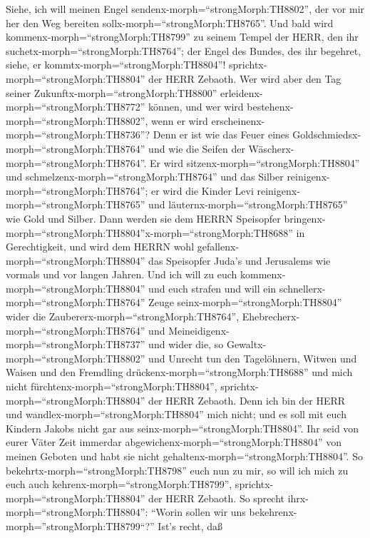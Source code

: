  Siehe, ich will meinen Engel
sendenx-morph=``strongMorph:TH8802'', der vor mir her den Weg bereiten
sollx-morph=``strongMorph:TH8765''. Und bald wird
kommenx-morph=``strongMorph:TH8799'' zu seinem Tempel der HERR, den ihr
suchetx-morph=``strongMorph:TH8764''; der Engel des Bundes, des ihr
begehret, siehe, er kommtx-morph=``strongMorph:TH8804''!
sprichtx-morph=``strongMorph:TH8804'' der HERR Zebaoth.  Wer
wird aber den Tag seiner Zukunftx-morph=``strongMorph:TH8800''
erleidenx-morph=``strongMorph:TH8772'' können, und wer wird
bestehenx-morph=``strongMorph:TH8802'', wenn er wird
erscheinenx-morph=``strongMorph:TH8736''? Denn er ist wie das Feuer
eines Goldschmiedsx-morph=``strongMorph:TH8764'' und wie die Seifen der
Wäscherx-morph=``strongMorph:TH8764''.  Er wird
sitzenx-morph=``strongMorph:TH8804'' und
schmelzenx-morph=``strongMorph:TH8764'' und das Silber
reinigenx-morph=``strongMorph:TH8764''; er wird die Kinder Levi
reinigenx-morph=``strongMorph:TH8765'' und
läuternx-morph=``strongMorph:TH8765'' wie Gold und Silber. Dann werden
sie dem HERRN Speisopfer
bringenx-morph=``strongMorph:TH8804''x-morph=``strongMorph:TH8688'' in
Gerechtigkeit,  und wird dem HERRN wohl
gefallenx-morph=``strongMorph:TH8804'' das Speisopfer Juda's und
Jerusalems wie vormals und vor langen Jahren.  Und ich will
zu euch kommenx-morph=``strongMorph:TH8804'' und euch strafen und will
ein schnellerx-morph=``strongMorph:TH8764'' Zeuge
seinx-morph=``strongMorph:TH8804'' wider die
Zaubererx-morph=``strongMorph:TH8764'',
Ehebrecherx-morph=``strongMorph:TH8764'' und
Meineidigenx-morph=``strongMorph:TH8737'' und wider die, so
Gewaltx-morph=``strongMorph:TH8802'' und Unrecht tun den Tagelöhnern,
Witwen und Waisen und den Fremdling
drückenx-morph=``strongMorph:TH8688'' und mich nicht
fürchtenx-morph=``strongMorph:TH8804'',
sprichtx-morph=``strongMorph:TH8804'' der HERR Zebaoth. 
Denn ich bin der HERR und wandlex-morph=``strongMorph:TH8804'' mich
nicht; und es soll mit euch Kindern Jakobs nicht gar aus
seinx-morph=``strongMorph:TH8804''.  Ihr seid von eurer
Väter Zeit immerdar abgewichenx-morph=``strongMorph:TH8804'' von meinen
Geboten und habt sie nicht gehaltenx-morph=``strongMorph:TH8804''. So
bekehrtx-morph=``strongMorph:TH8798'' euch nun zu mir, so will ich mich
zu euch auch kehrenx-morph=``strongMorph:TH8799'',
sprichtx-morph=``strongMorph:TH8804'' der HERR Zebaoth. So sprecht
ihrx-morph=``strongMorph:TH8804'': ``Worin sollen wir uns
bekehrenx-morph=''strongMorph:TH8799``?''  Ist's recht, daß
